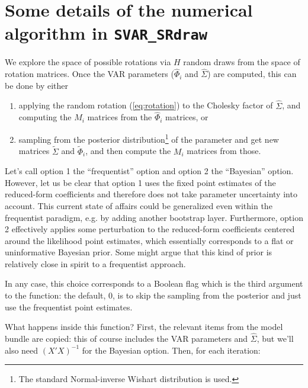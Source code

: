 \documentclass[a4paper,10pt]{article}
\newcommand{\dtk}[1]{\texttt{\detokenize{#1}}}
\begin{document}

\clearpage

\section{Some details of the numerical algorithm in \texttt{SVAR\_SRdraw}}
\label{sec:SRdraw_details}

We explore the space of possible rotations via $H$ random draws from the space
of rotation matrices.  Once the VAR parameters ($\hat{\Phi}_i$ and
$\hat{\Sigma}$) are computed, this can be done by either
\begin{enumerate}
\item applying the random rotation (\ref{eq:rotation}) to the Cholesky factor of
  $\hat{\Sigma}$, and computing the $M_i$ matrices from the $\hat{\Phi}_i$
  matrices, or
\item sampling from the posterior distribution\footnote{The standard
    Normal-inverse Wishart distribution is used.} of the parameter and get new
  matrices $\tilde{\Sigma}$ and $\tilde{\Phi}_i$, and then compute the $M_i$
  matrices from those.
\end{enumerate}
Let's call option 1 the ``frequentist'' option and option 2 the ``Bayesian''
option. However, let us be clear that option 1 uses the fixed point estimates of
the reduced-form coefficients and therefore does not take parameter uncertainty
into account. This current state of affairs could be generalized even within the
frequentist paradigm, e.g. by adding another bootstrap layer. Furthermore,
option 2 effectively applies some perturbation to the reduced-form coefficients
centered around the likelihood point estimates, which essentially corresponds to
a flat or uninformative Bayesian prior. Some might argue that this kind of prior
is relatively close in spirit to a frequentist approach.

In any case, this choice corresponds to a Boolean flag which is the third
argument to the \dtk{SVAR_SRdraw} function: the default, 0, is to skip the
sampling from the posterior and just use the frequentist point estimates.

What happens inside this function? First, the relevant items from the model
bundle are copied: this of course includes the VAR parameters and
$\hat{\Sigma}$, but we'll also need $(X'X)^{-1}$ for the Bayesian option.  Then,
for each iteration:
\end{document}
